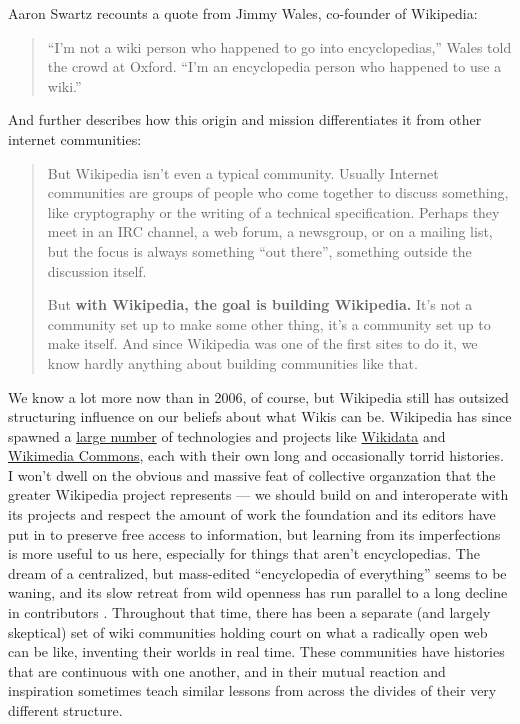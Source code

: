 Aaron Swartz recounts a quote from Jimmy Wales, co-founder of Wikipedia:

\begin{quote}
``I'm not a wiki person who happened to go into encyclopedias,'' Wales
told the crowd at Oxford. ``I'm an encyclopedia person who happened to
use a wiki.'' \citep{swartzWhoWritesWikipedia2006} 
\end{quote}

And further describes how this origin and mission differentiates it from
other internet communities:

\begin{quote}
But Wikipedia isn't even a typical community. Usually Internet
communities are groups of people who come together to discuss something,
like cryptography or the writing of a technical specification. Perhaps
they meet in an IRC channel, a web forum, a newsgroup, or on a mailing
list, but the focus is always something ``out there'', something outside
the discussion itself.

But \textbf{with Wikipedia, the goal is building Wikipedia.} It's not a
community set up to make some other thing, it's a community set up to
make itself. And since Wikipedia was one of the first sites to do it, we
know hardly anything about building communities like that. \citep{swartzMakingMoreWikipedias2006} 
\end{quote}

We know a lot more now than in 2006, of course, but Wikipedia still has
outsized structuring influence on our beliefs about what Wikis can be.
Wikipedia has since spawned a
\href{https://meta.wikimedia.org/wiki/Complete_list_of_Wikimedia_projects}{large
number} of technologies and projects like
\href{https://meta.wikimedia.org/wiki/Wikidata}{Wikidata} and
\href{https://commons.wikimedia.org/wiki/Main_Page}{Wikimedia Commons},
each with their own long and occasionally torrid histories. I won't
dwell on the obvious and massive feat of collective organzation that the
greater Wikipedia project represents --- we should build on and
interoperate with its projects and respect the amount of work the
foundation and its editors have put in to preserve free access to
information, but learning from its imperfections is more useful to us
here, especially for things that aren't encyclopedias. The dream of a
centralized, but mass-edited ``encyclopedia of everything'' seems to be
waning, and its slow retreat from wild openness has run parallel to a
long decline in contributors \citep{hillWikipediaEndOpen2019, halfakerRiseDeclineOpen2013} . Throughout that time, there has been a
separate (and largely skeptical) set of wiki communities holding court
on what a radically open web can be like, inventing their worlds in real
time. These communities have histories that are continuous with one
another, and in their mutual reaction and inspiration sometimes teach
similar lessons from across the divides of their very different
structure.

